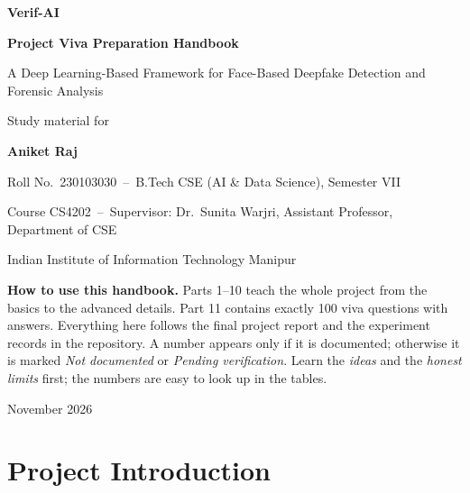 \documentclass[11pt,a4paper]{report}
\begin{document}
\raggedbottom

\begin{titlepage}
\centering
\vspace*{2.2cm}
{\Huge\bfseries\color{navy} Verif-AI\par}
\vspace{0.4cm}
{\LARGE\bfseries Project Viva Preparation Handbook\par}
\vspace{0.6cm}
{\large A Deep Learning-Based Framework for Face-Based Deepfake Detection and Forensic Analysis\par}
\vspace{2.2cm}
{\large Study material for\par}
\vspace{0.2cm}
{\Large\bfseries Aniket Raj\par}
{\large Roll No.\ 230103030 \,--\, B.Tech CSE (AI \& Data Science), Semester VII\par}
{\large Course CS4202 \,--\, Supervisor: Dr.\ Sunita Warjri, Assistant Professor, Department of CSE\par}
{\large Indian Institute of Information Technology Manipur\par}
\vfill
\begin{tcolorbox}[colback=softgrey,colframe=black!25,width=0.92\linewidth,left=8pt,right=8pt]
\small\textbf{How to use this handbook.} Parts 1--10 teach the whole project from the basics to the advanced details. Part 11 contains exactly 100 viva questions with answers.
Everything here follows the final project report and the experiment records in the repository. A number appears only if it is documented; otherwise it is marked
\emph{Not documented} or \emph{Pending verification}. Learn the \emph{ideas} and the \emph{honest limits} first; the numbers are easy to look up in the tables.
\end{tcolorbox}
\vspace{0.8cm}
{\small November 2026}
\end{titlepage}

\tableofcontents
\clearpage

\chapter{Project Introduction}
\end{document}
